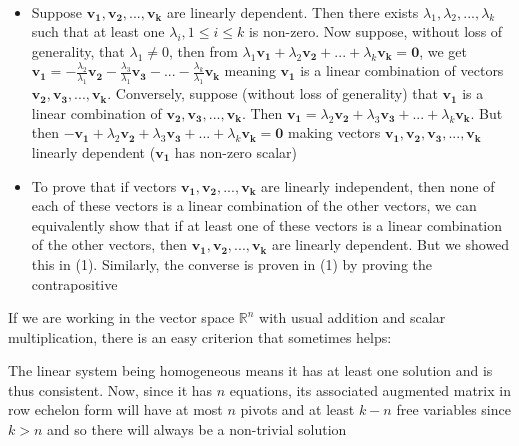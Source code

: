 \documentclass{report}
\begin{document}
\begin{myproof}
~\\    
\begin{itemize}
    \item Suppose $\mathbf{v_1}, \mathbf{v_2}, ..., \mathbf{v_k}$ are linearly dependent. Then there exists $\lambda _1 , \lambda _2 , ..., \lambda _k $ such that at least one $\lambda _i , 1\le i\le k$ is non-zero. Now suppose, without loss of generality, that $\lambda _1 \ne 0$, then from $\lambda _1 \mathbf{v_1} + \lambda _2 \mathbf{v_2} + ... + \lambda _k \mathbf{v_k} = \mathbf{0}$, we get $\mathbf{v_1} = -\frac{\lambda _2}{\lambda_1}\mathbf{v_2} -\frac{\lambda _3}{\lambda_1}\mathbf{v_3}-...-\frac{\lambda _k}{\lambda_1} \mathbf{v_k}$ meaning $\mathbf{v_1}$ is a linear combination of vectors $\mathbf{v_2}, \mathbf{v_3}, ..., \mathbf{v_k}$. Conversely, suppose (without loss of generality) that $\mathbf{v_1}$ is a linear combination of $\mathbf{v_2}, \mathbf{v_3}, ..., \mathbf{v_k}$. Then $\mathbf{v_1} = \lambda _2\mathbf{v_2} + {\lambda _3}\mathbf{v_3}+...+{\lambda _k}\mathbf{v_k}$. But then $-\mathbf{v_1} + \lambda _2\mathbf{v_2} + {\lambda _3}\mathbf{v_3}+...+{\lambda _k}\mathbf{v_k} = \mathbf{0}$ making vectors $\mathbf{v_1},\mathbf{v_2}, \mathbf{v_3}, ..., \mathbf{v_k}$ linearly dependent ($\mathbf{v_1}$ has non-zero scalar) 
    \item To prove that if vectors $\mathbf{v_1}, \mathbf{v_2}, ..., \mathbf{v_k}$ are linearly independent, then none of each of these vectors is a linear combination of the other vectors, we can equivalently show that if at least one of these vectors is a linear combination of the other vectors, then $\mathbf{v_1}, \mathbf{v_2}, ..., \mathbf{v_k}$ are linearly dependent. But we showed this in (1). Similarly, the converse is proven in (1) by proving the contrapositive
\end{itemize}
\end{myproof}


If we are working in the vector space $\mathbb{R}^n$ with usual addition and scalar multiplication, there is an easy criterion that sometimes helps:


\begin{myproof}
    
The linear system being homogeneous means it has at least one solution and is thus consistent. Now, since it has $n$ equations, its associated augmented matrix in row echelon form will have at most $n$ pivots and at least $k-n$ free variables since $k>n$ and so there will always be a non-trivial solution
\end{myproof}
\end{document}
